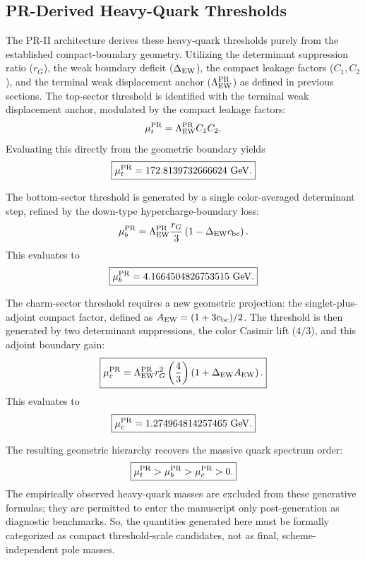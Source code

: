 \documentclass[11pt]{article}
\begin{document}
\subsection{PR-Derived Heavy-Quark Thresholds}
\label{sec:pr2_pr_derived_heavy_quark_thresholds}

The PR-II architecture derives these heavy-quark thresholds purely from the established compact-boundary geometry. Utilizing the determinant suppression ratio (\(r_G\)), the weak boundary deficit (\(\Delta_{\rm EW}\)), the compact leakage factors (\(C_1, C_2\)), and the terminal weak displacement anchor (\(\Lambda_{\rm EW}^{\rm PR}\)) as defined in previous sections. The top-sector threshold is identified with the terminal weak displacement anchor, modulated by the compact leakage factors:
\begin{equation}
\mu_t^{\rm PR}
=
\Lambda_{\rm EW}^{\rm PR}C_1C_2.
\end{equation}
Evaluating this directly from the geometric boundary yields
\begin{equation}
\boxed{
\mu_t^{\rm PR}
=
172.8139732666624\ {\rm GeV}.
}
\end{equation}

The bottom-sector threshold is generated by a single color-averaged determinant step, refined by the down-type hypercharge-boundary loss:
\begin{equation}
\mu_b^{\rm PR}
=
\Lambda_{\rm EW}^{\rm PR}
\frac{r_G}{3}
\left(
1-\Delta_{\rm EW}c_{\rm bc}
\right).
\end{equation}
This evaluates to
\begin{equation}
\boxed{
\mu_b^{\rm PR}
=
4.1664504826753515\ {\rm GeV}.
}
\end{equation}

The charm-sector threshold requires a new geometric projection: the singlet-plus-adjoint compact factor, defined as \(A_{\rm EW} = (1+3c_{\rm bc})/2\). The threshold is then generated by two determinant suppressions, the color Casimir lift (\(4/3\)), and this adjoint boundary gain:
\begin{equation}
\boxed{
\mu_c^{\rm PR}
=
\Lambda_{\rm EW}^{\rm PR}
r_G^2
\left(
\frac43
\right)
\left(
1+\Delta_{\rm EW}A_{\rm EW}
\right).
}
\end{equation}
This evaluates to
\begin{equation}
\boxed{
\mu_c^{\rm PR}
=
1.274964814257465\ {\rm GeV}.
}
\end{equation}

The resulting geometric hierarchy recovers the massive quark spectrum order:
\begin{equation}
\boxed{
\mu_t^{\rm PR}
>
\mu_b^{\rm PR}
>
\mu_c^{\rm PR}
>
0.
}
\end{equation}
The empirically observed heavy-quark masses are excluded from these generative formulas; they are permitted to enter the manuscript only post-generation as diagnostic benchmarks. So, the quantities generated here must be formally categorized as compact threshold-scale candidates, not as final, scheme-independent pole masses.
\end{document}
